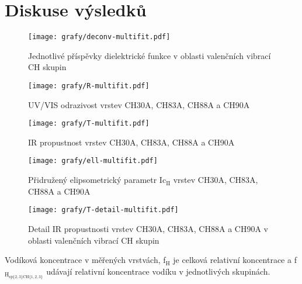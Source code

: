 \chapter{Diskuse výsledků}

\begin{figure}[ht]
	\texttt{[image: grafy/deconv-multifit.pdf]}
	\caption{Jednotlivé příspěvky dielektrické funkce v oblasti valenčních vibrací CH skupin}
\end{figure}

\begin{figure}[ht]
	\texttt{[image: grafy/R-multifit.pdf]}
	\caption{UV/VIS odrazivost vrstev CH30A, CH83A, CH88A a CH90A}
\end{figure}

\begin{figure}[ht]
	\texttt{[image: grafy/T-multifit.pdf]}
	\caption{IR propustnost vrstev CH30A, CH83A, CH88A a CH90A}
\end{figure}

\begin{figure}[ht]
	\texttt{[image: grafy/ell-multifit.pdf]}
	\caption{Přidružený elipsometrický parametr Ic$_{\mathrm{II}}$ vrstev CH30A, CH83A, CH88A a CH90A}
\end{figure}

\begin{figure}[ht]
	\texttt{[image: grafy/T-detail-multifit.pdf]}
	\caption{Detail IR propustnosti vrstev CH30A, CH83A, CH88A a CH90A v oblasti valenčních vibrací CH skupin}
\end{figure}

\begin{table}[htbp]
 \centering
 
 \caption{Vodíková koncentrace v měřených vrstvách, f$_\mathrm{H}$ je celková relativní koncentrace a f$_\mathrm{H_{sp\{2,3\}CH\{1,2,3\}}}$ udávají relativní koncentrace vodíku v jednotlivých skupinách.}
\label{deppodminky}
\end{table}

\cleardoublepage
